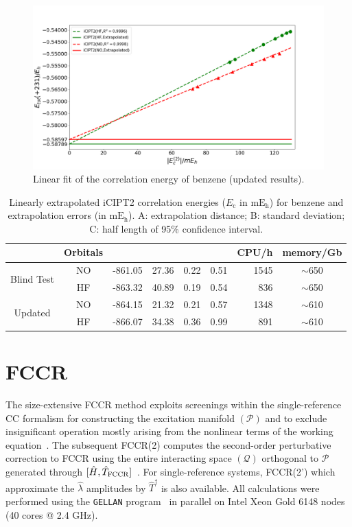 \documentclass[journal=jcp,manuscript=suppinfo]{achemso}
\begin{document}
\begin{figure}[!htp]
	\centering
	\includegraphics[width=\textwidth]{figures/ici/benzene_ici_updated.png}
	\caption{Linear fit of the correlation energy of benzene (updated results).}\label{BenzeneEnNew}
\end{figure}

\begin{table}[!htp]
	\centering
	\caption{Linearly extrapolated iCIPT2 correlation energies ($E_{\mathrm{c}}$ in $\mathrm{mE_h}$) for benzene and
extrapolation errors (in $\mathrm{mE_h}$). A: extrapolation distance; B: standard deviation; C:
half length of 95\% confidence interval.}
	\begin{tabular}{ccccccrc}\toprule
		&Orbitals
		&\makecell{$E_{\mathrm{c}}$}
		&\makecell{A}
		&\makecell{B}
		&\makecell{C}
		&CPU/h&memory/Gb
		\\\toprule
		\multirow{2}{*}{Blind Test}
		&NO&-861.05&27.36&0.22&0.51&1545&$\sim$650\\
		&HF&-863.32&40.89&0.19&0.54&836&$\sim$650\\\midrule
		\multirow{2}{*}{Updated}
		&NO&-864.15&21.32&0.21&0.57&1348&$\sim$610\\
		&HF&-866.07&34.38&0.36&0.99&891&$\sim$610\\\bottomrule
	\end{tabular}
\label{iCIsum}
\end{table}

\section{FCCR}

The size-extensive FCCR method exploits screenings within the single-reference CC formalism for constructing the excitation manifold $({\mathcal P})$ and to exclude insignificant operation mostly arising from the nonlinear terms of the working equation~\cite{ten_no_fcc_prl_2018}. The subsequent FCCR(2) computes the second-order perturbative correction to FCCR using the entire interacting space $({\mathcal Q})$ orthogonal to ${\mathcal P}$ generated through $[\hat H, \hat T_{\rm FCCR}]$~\cite{ten_no_fccr_2020}. For single-reference systems, FCCR(2') which approximate the $\hat \lambda$ amplitudes by $\hat T^{\dagger}$ is also available. All calculations were performed using the \texttt{GELLAN} program~\cite{gellan} in parallel on Intel Xeon Gold 6148 nodes (40 cores @ 2.4 GHz).\\
\end{document}
